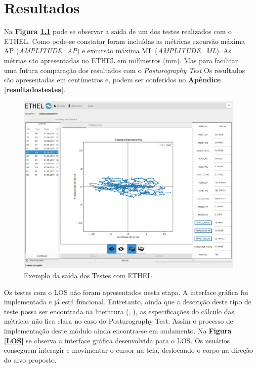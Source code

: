 \chapter{Resultados} \label{resultados}

  Na\textbf{ Figura \ref{ETHEL}} pode se observar a saída de um dos testes realizados com o ETHEL. Como pode-se constatar foram incluídas as métricas excursão máxima AP (\textit{AMPLITUDE\_AP}) e excursão máxima ML (\textit{AMPLITUDE\_ML}). As métrias são apresentadas no ETHEL em milímetros (mm). Mas para facilitar uma futura comparação dos resultados com o \textit{Posturography Test} Os resultados são apresentadas em centímetros e, podem ser conferidos no \textbf{Apêndice \ref{resultadostestes}}. 


\begin{figure}[ht]
\captionsetup{justification   = raggedright,
              singlelinecheck = false}
\caption{Exemplo da saída dos Testes com ETHEL}\label{ETHEL}
\includegraphics[width=1.0\textwidth]{figs/ETHEL.png}
\end{figure}


Os testes com o LOS não foram apresentados nesta etapa. A interface gráfica foi implementada e já está funcional. Entretanto, ainda que a descrição deste tipo de teste possa ser encontrada na literatura (\citeauthor{tsang2003effects}, \citeyear{tsang2003effects}), as especificações do cálculo das métricas não fica clara no caso do Posturography Test. Assim o processo de implementação deste módulo ainda encontra-se em andamento. Na \textbf{Figura \ref{LOS}} se observa a interface gráfica desenvolvida para o LOS. Os usuários conseguem interagir e movimentar o cursor na tela, deslocando o corpo na direção do alvo proposto.


